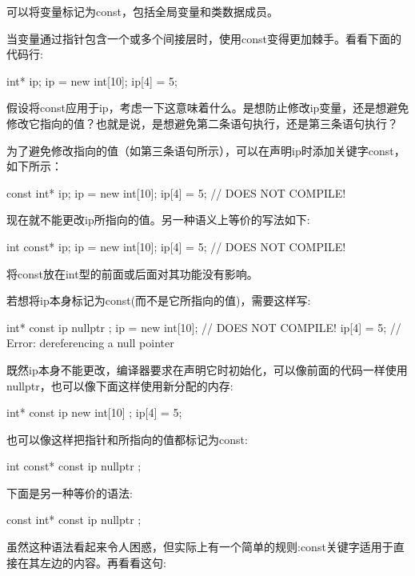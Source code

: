 可以将变量标记为const，包括全局变量和类数据成员。


当变量通过指针包含一个或多个间接层时，使用const变得更加棘手。看看下面的代码行:

\begin{cpp}
int* ip;
ip = new int[10];
ip[4] = 5;
\end{cpp}

假设将const应用于ip，考虑一下这意味着什么。是想防止修改ip变量，还是想避免修改它指向的值？也就是说，是想避免第二条语句执行，还是第三条语句执行？

为了避免修改指向的值（如第三条语句所示），可以在声明ip时添加关键字const，如下所示：

\begin{cpp}
const int* ip;
ip = new int[10];
ip[4] = 5; // DOES NOT COMPILE!
\end{cpp}

现在就不能更改ip所指向的值。另一种语义上等价的写法如下:

\begin{cpp}
int const* ip;
ip = new int[10];
ip[4] = 5; // DOES NOT COMPILE!
\end{cpp}

将const放在int型的前面或后面对其功能没有影响。

若想将ip本身标记为const(而不是它所指向的值)，需要这样写:

\begin{cpp}
int* const ip { nullptr };
ip = new int[10]; // DOES NOT COMPILE!
ip[4] = 5; // Error: dereferencing a null pointer
\end{cpp}

既然ip本身不能更改，编译器要求在声明它时初始化，可以像前面的代码一样使用nullptr，也可以像下面这样使用新分配的内存:

\begin{cpp}
int* const ip { new int[10] };
ip[4] = 5;
\end{cpp}

也可以像这样把指针和所指向的值都标记为const:

\begin{cpp}
int const* const ip { nullptr };
\end{cpp}

下面是另一种等价的语法:

\begin{cpp}
const int* const ip { nullptr };
\end{cpp}

虽然这种语法看起来令人困惑，但实际上有一个简单的规则:const关键字适用于直接在其左边的内容。再看看这句:

